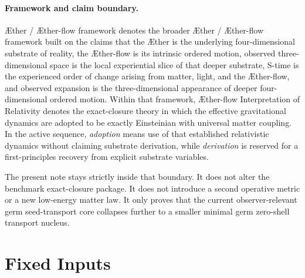 \documentclass[11pt]{article}
\newcommand{\Aether}{\AE{}ther}
\newcommand{\Aflow}{\AE{}ther-flow}
\newcommand{\TheoryName}{\Aflow{} Interpretation of Relativity}
\newcommand{\TheoryProgram}{\Aether{} / \Aflow{} framework}
\begin{document}
\paragraph{Framework and claim boundary.}
\TheoryProgram{} denotes the broader \Aether{} / \Aflow{} framework built on the claims that the \Aether{} is the underlying four-dimensional substrate of reality, the \Aflow{} is its intrinsic ordered motion, observed three-dimensional space is the local experiential slice of that deeper substrate, S-time is the experienced order of change arising from matter, light, and the \Aflow{}, and observed expansion is the three-dimensional appearance of deeper four-dimensional ordered motion. Within that framework, \TheoryName{} denotes the exact-closure theory in which the effective gravitational dynamics are adopted to be exactly Einsteinian with universal matter coupling. In the active sequence, \emph{adoption} means use of that established relativistic dynamics without claiming substrate derivation, while \emph{derivation} is reserved for a first-principles recovery from explicit substrate variables.

The present note stays strictly inside that boundary. It does not alter the benchmark exact-closure package. It does not introduce a second operative metric or a new low-energy matter law. It only proves that the current observer-relevant germ seed-transport core collapses further to a smaller minimal germ zero-shell transport nucleus.

\section{Fixed Inputs}
\end{document}
